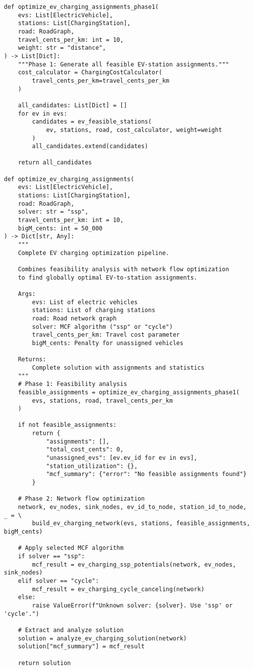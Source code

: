 \documentclass[12pt,a4paper]{article}
\begin{document}
\begin{lstlisting}[caption=Complete Optimization Pipeline]
def optimize_ev_charging_assignments_phase1(
    evs: List[ElectricVehicle],
    stations: List[ChargingStation],
    road: RoadGraph,
    travel_cents_per_km: int = 10,
    weight: str = "distance",
) -> List[Dict]:
    """Phase 1: Generate all feasible EV-station assignments."""
    cost_calculator = ChargingCostCalculator(
        travel_cents_per_km=travel_cents_per_km
    )
    
    all_candidates: List[Dict] = []
    for ev in evs:
        candidates = ev_feasible_stations(
            ev, stations, road, cost_calculator, weight=weight
        )
        all_candidates.extend(candidates)
    
    return all_candidates

def optimize_ev_charging_assignments(
    evs: List[ElectricVehicle],
    stations: List[ChargingStation],
    road: RoadGraph,
    solver: str = "ssp",
    travel_cents_per_km: int = 10,
    bigM_cents: int = 50_000
) -> Dict[str, Any]:
    """
    Complete EV charging optimization pipeline.
    
    Combines feasibility analysis with network flow optimization
    to find globally optimal EV-to-station assignments.
    
    Args:
        evs: List of electric vehicles
        stations: List of charging stations  
        road: Road network graph
        solver: MCF algorithm ("ssp" or "cycle")
        travel_cents_per_km: Travel cost parameter
        bigM_cents: Penalty for unassigned vehicles
    
    Returns:
        Complete solution with assignments and statistics
    """
    # Phase 1: Feasibility analysis
    feasible_assignments = optimize_ev_charging_assignments_phase1(
        evs, stations, road, travel_cents_per_km
    )
    
    if not feasible_assignments:
        return {
            "assignments": [],
            "total_cost_cents": 0,
            "unassigned_evs": [ev.ev_id for ev in evs],
            "station_utilization": {},
            "mcf_summary": {"error": "No feasible assignments found"}
        }
    
    # Phase 2: Network flow optimization
    network, ev_nodes, sink_nodes, ev_id_to_node, station_id_to_node, _ = \
        build_ev_charging_network(evs, stations, feasible_assignments, bigM_cents)
    
    # Apply selected MCF algorithm
    if solver == "ssp":
        mcf_result = ev_charging_ssp_potentials(network, ev_nodes, sink_nodes)
    elif solver == "cycle":
        mcf_result = ev_charging_cycle_canceling(network)
    else:
        raise ValueError(f"Unknown solver: {solver}. Use 'ssp' or 'cycle'.")
    
    # Extract and analyze solution
    solution = analyze_ev_charging_solution(network)
    solution["mcf_summary"] = mcf_result
    
    return solution
\end{lstlisting}
\end{document}
